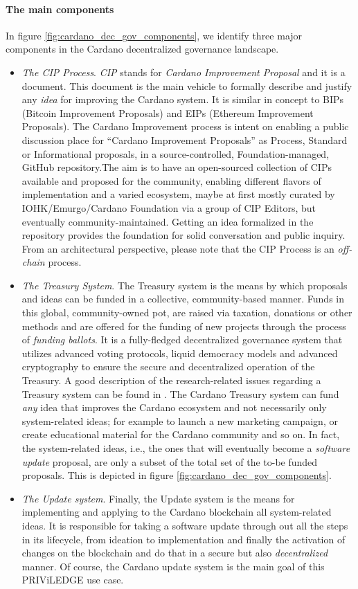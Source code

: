 \paragraph{The main components}
In figure \ref{fig:cardano_dec_gov_components}, we identify three major
components in the Cardano decentralized governance landscape.
\begin{itemize}
	\item \emph{The CIP Process}. \emph{CIP} stands for \emph{Cardano
		Improvement Proposal} and it is a document. This document is the main
	vehicle to formally describe and justify any \emph{idea} for improving the
	Cardano system. It is similar in concept to BIPs (Bitcoin Improvement
	Proposals)  and EIPs (Ethereum Improvement Proposals). The Cardano
	Improvement process is intent on enabling a public discussion place for
	``Cardano Improvement Proposals'' as Process, Standard or Informational
	proposals, in a source-controlled, Foundation-managed, GitHub
	repository.The aim is to have an open-sourced collection of CIPs available
	and proposed for the community, enabling different flavors of
	implementation and a varied ecosystem, maybe at first mostly curated by
	IOHK/Emurgo/Cardano Foundation via a group of CIP Editors, but eventually
	community-maintained. Getting an idea formalized in the repository provides
	the foundation for solid conversation and public inquiry. From an
	architectural perspective, please note that the CIP Process is an
	\emph{off-chain} process.

	\item \emph{The Treasury System}. The Treasury system is the means by
	which proposals and ideas can be funded in a collective, community-based
	manner. Funds in this global, community-owned pot, are raised via taxation,
	donations or other methods and are offered for the funding of new projects
	through the process of \emph{funding ballots}. It is a fully-fledged
	decentralized
	governance system that utilizes advanced voting protocols, liquid democracy
	models and advanced cryptography to ensure the secure and decentralized
	operation of the Treasury. A good description of the research-related
	issues regarding a Treasury system can be found in
	\cite{treasury}. The Cardano Treasury system can
	fund \emph{any} idea that improves the Cardano ecosystem and not
	necessarily only system-related ideas; for example to launch a new
	marketing campaign, or create educational material for the Cardano
	community and so on. In fact, the system-related ideas,
	i.e., the ones that will eventually become a \emph{software update}
	proposal, are only a subset of the total set of the to-be funded proposals.
	This is depicted in figure \ref{fig:cardano_dec_gov_components}.

	\item \emph{The Update system}. Finally, the Update system is the means for
	implementing and applying to the Cardano blockchain all system-related
	ideas. It is responsible for taking a software update through out all the
	steps in its lifecycle, from ideation to implementation and finally the
	activation of changes on the blockchain and do that in a secure but also
	\emph{decentralized} manner.
	Of course, the Cardano update system is the main goal of this
	PRIViLEDGE use case.
\end{itemize}

